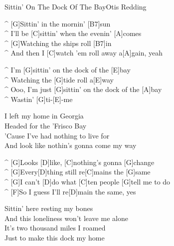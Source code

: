 \begin{song}{Sittin' On The Dock Of The Bay}{Otis Redding}


\begin{guitar}
^ [G]Sittin' in the mornin' [B7]sun\\
^ I'll be [C]sittin' when the evenin' [A]comes\\
^ [G]Watching the ships roll [B7]in\\
^ And then I [C]watch 'em roll away a[A]gain, yeah\\
\end{guitar}


\begin{guitar}
^ I'm [G]sittin' on the dock of the [E]bay\\
^ Watching the [G]tide roll a[E]way\\
^ Ooo, I'm just [G]sittin' on the dock of the [A]bay\\
^ Wastin' [G]ti-[E]-me\\
\end{guitar}


\begin{guitar}
I left my home in Georgia\\
Headed for the 'Frisco Bay\\
'Cause I've had nothing to live for\\
And look like nothin's gonna come my way\\
\end{guitar}



\begin{guitar}
^ [G]Looks [D]like, [C]nothing's gonna [G]change\\
^ [G]Every[D]thing still re[C]mains the [G]same\\
^ [G]I can't [D]do what [C]ten people [G]tell me to do\\
^ [F]So I guess I'll re[D]main the same, yes\\
\end{guitar}


\begin{guitar}
Sittin' here resting my bones\\
And this loneliness won't leave me alone\\
It's two thousand miles I roamed\\
Just to make this dock my home\\
\end{guitar}


\end{song}
